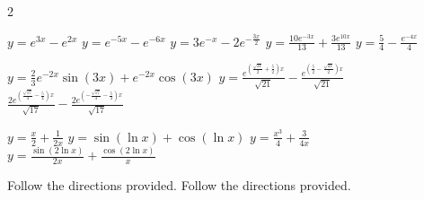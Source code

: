 \begin{multicols}{2}
\begin{Answer}[ref={EX32}]
\Question \label{3-2-5a}
\begin{tasks}
	\task \(y=e^{3 x}-e^{2 x}\)
	\task \(y =e^{-5 x}-e^{-6 x}\)
	\task \(y=3 e^{-x}-2 e^{-\frac{3 x}{2}}\)
	\task \(y=\frac{10 e^{-3 x}}{13}+\frac{3 e^{10 x}}{13}\)
	\task \(y=\frac{5}{4}-\frac{e^{-4 x}}{4}\)
	
	\task \(y=\frac{2}{3} e^{-2 x} \sin (3 x)+e^{-2 x} \cos (3 x)\)
	\task \(y= \frac{e^{\left(\frac{\sqrt{21}}{2}+\frac{5}{2}\right) x}}{\sqrt{21}}-\frac{e^{\left(\frac{5}{2}-\frac{\sqrt{21}}{2}\right) x}}{\sqrt{21}}\)
	\task \(\frac{2 e^{\left(\frac{\sqrt{17}}{4}-\frac{5}{4}\right) x}}{\sqrt{17}}-\frac{2 e^{\left(-\frac{\sqrt{17}}{4}-\frac{5}{4}\right) x}}{\sqrt{17}}\)
	
	\task \(y= \frac{x}{2}+\frac{1}{2 x}\)
	\task \(y=\sin (\ln x )+\cos (\ln x)\)
	\task \(y =\frac{x^3}{4}+\frac{3}{4 x}\)
	\task \(y=\frac{\sin (2 \ln x)}{2 x}+\frac{\cos (2 \ln x)}{x}\)
\end{tasks}
\Question \label{3-2-6a} Follow the directions provided.
\Question \label{3-2-7a} Follow the directions provided.
 	\end{Answer}
 \end{multicols}
 

%	
%	
%		
%	
%	
%	
%
%		
%			
%
